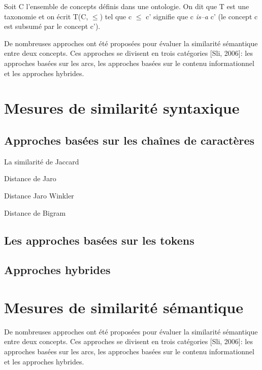 \begin{mydef}
  Soit C l'ensemble de concepts définis dans une ontologie. On dit que
  T est une taxonomie et on écrit T(C, $\leq$) tel que c $\leq$ c'
  signifie que c \textit{is–a} c' (le concept c est subsumé par le
  concept c').
\end{mydef}

De nombreuses approches ont été proposées pour évaluer la similarité
sémantique entre deux concepts. Ces approches se divisent en trois
catégories [Sli, 2006]: les approches basées sur les arcs, les
approches basées sur le contenu informationnel et les approches
hybrides.

\section{Mesures de similarité syntaxique}
\label{sec:syntactic-sim}

  \subsection{Approches basées sur les chaînes de caractères}
  \label{sec:syntactic-sim:string}

  La similarité de Jaccard

  Distance de Jaro

  Distance Jaro Winkler

  Distance de Bigram

  \subsection{Les approches basées sur les tokens}
  \label{sec:syntactic-sim:tokens}

  \subsection{Approches hybrides}
  \label{sec:syntactic-sim:hybrides}

\section{Mesures de similarité sémantique}
\label{sec:semantic-sim}

De nombreuses approches ont été proposées pour évaluer la similarité
sémantique entre deux concepts. Ces approches se divisent en trois
catégories [Sli, 2006]: les approches basées sur les arcs, les
approches basées sur le contenu informationnel et les approches
hybrides.

